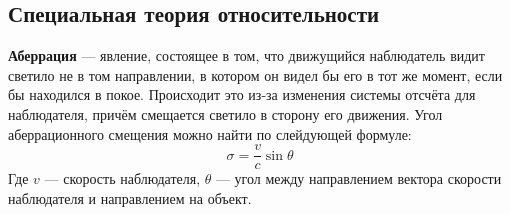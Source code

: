 \subsection{Специальная теория относительности}

\textbf{Аберрация} --- явление, состоящее в том, что движущийся наблюдатель видит светило не в том направлении, в котором он видел бы его в тот же момент, если бы находился в покое. Происходит это из-за изменения системы отсчёта для наблюдателя, причём смещается светило в сторону его движения. 
Угол аберрационного смещения можно найти по слейдующей формуле:
\begin{equation}\sigma=\frac{v}{c}\sin\theta
\end{equation}
Где $v$ --- скорость наблюдателя, $\theta$ --- угол между направлением вектора скорости наблюдателя и направлением на объект.